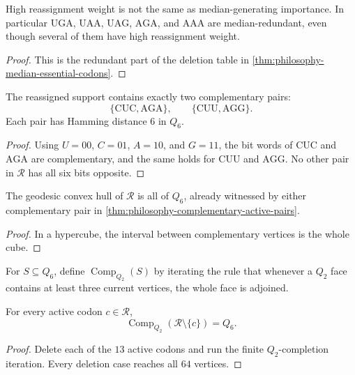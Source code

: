\begin{corollary}
\label{cor:philosophy-weight-median-generation-differ}
High reassignment weight is not the same as median-generating
importance. In particular $\mathrm{UGA}$, $\mathrm{UAA}$,
$\mathrm{UAG}$, $\mathrm{AGA}$, and $\mathrm{AAA}$ are
median-redundant, even though several of them have high reassignment
weight.
\end{corollary}
\begin{proof}
This is the redundant part of the deletion table in
\autoref{thm:philosophy-median-essential-codons}.
\end{proof}

\begin{theorem}
\label{thm:philosophy-complementary-active-pairs}
The reassigned support contains exactly two complementary pairs:
$$
  \{\mathrm{CUC},\mathrm{AGA}\},
  \qquad
  \{\mathrm{CUU},\mathrm{AGG}\}.
$$
Each pair has Hamming distance $6$ in $Q_{6}$.
\end{theorem}
\begin{proof}
Using $U=00$, $C=01$, $A=10$, and $G=11$, the bit words of
$\mathrm{CUC}$ and $\mathrm{AGA}$ are complementary, and the same holds
for $\mathrm{CUU}$ and $\mathrm{AGG}$. No other pair in
$\mathcal{R}$ has all six bits opposite.
\end{proof}

\begin{corollary}
\label{cor:philosophy-convex-hull-too-coarse}
The geodesic convex hull of $\mathcal{R}$ is all of $Q_{6}$, already
witnessed by either complementary pair in
\autoref{thm:philosophy-complementary-active-pairs}.
\end{corollary}
\begin{proof}
In a hypercube, the interval between complementary vertices is the
whole cube.
\end{proof}

\begin{definition}
\label{def:philosophy-q2-completion-closure}
For $S\subseteq Q_{6}$, define $\operatorname{Comp}_{Q_{2}}(S)$ by
iterating the rule that whenever a $Q_{2}$ face contains at least three
current vertices, the whole face is adjoined.
\end{definition}

\begin{theorem}
\label{thm:philosophy-single-deletion-completion-robustness}
For every active codon $c\in\mathcal{R}$,
$$
  \operatorname{Comp}_{Q_{2}}(\mathcal{R}\setminus\{c\})=Q_{6}.
$$
\end{theorem}
\begin{proof}
Delete each of the $13$ active codons and run the finite
$Q_{2}$-completion iteration. Every deletion case reaches all $64$
vertices.
\end{proof}

